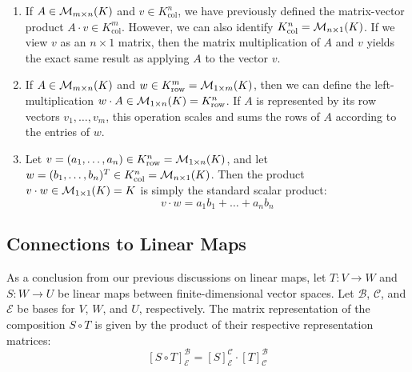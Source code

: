 \begin{enumerate}
    \item If $A \in \mathcal{M}_{m \times n}(K)$ and $v \in K_{\text{col}}^{n}$, we have previously defined the matrix-vector product $A \cdot v \in K_{\text{col}}^{m}$. However, we can also identify $K_{\text{col}}^{n} = \mathcal{M}_{n \times 1}(K)$. If we view $v$ as an $n \times 1$ matrix, then the matrix multiplication of $A$ and $v$ yields the exact same result as applying $A$ to the vector $v$.
    
    \item If $A \in \mathcal{M}_{m \times n}(K)$ and $w \in K_{\text{row}}^{m} = \mathcal{M}_{1 \times m}(K)$, then we can define the left-multiplication $w \cdot A \in \mathcal{M}_{1 \times n}(K) = K_{\text{row}}^{n}$. If $A$ is represented by its row vectors $v_1, \dots, v_m$, this operation scales and sums the rows of $A$ according to the entries of $w$.
    
    \item Let $v = (a_1, \dots, a_n) \in K_{\text{row}}^{n} = \mathcal{M}_{1 \times n}(K)$, and let $w = (b_1, \dots, b_n)^T \in K_{\text{col}}^{n} = \mathcal{M}_{n \times 1}(K)$. Then the product $v \cdot w \in \mathcal{M}_{1 \times 1}(K) = K$ is simply the standard scalar product:
    \begin{equation*}
        v \cdot w = a_1 b_1 + \dots + a_n b_n
    \end{equation*}
\end{enumerate}

\subsection{Connections to Linear Maps}

As a conclusion from our previous discussions on linear maps, let $T: V \to W$ and $S: W \to U$ be linear maps between finite-dimensional vector spaces. Let $\mathcal{B}$, $\mathcal{C}$, and $\mathcal{E}$ be bases for $V$, $W$, and $U$, respectively. The matrix representation of the composition $S \circ T$ is given by the product of their respective representation matrices:
\[
    [S \circ T]_{\mathcal{E}}^{\mathcal{B}} = [S]_{\mathcal{E}}^{\mathcal{C}} \cdot [T]_{\mathcal{C}}^{\mathcal{B}}
\]

\begin{center}
\end{center}

